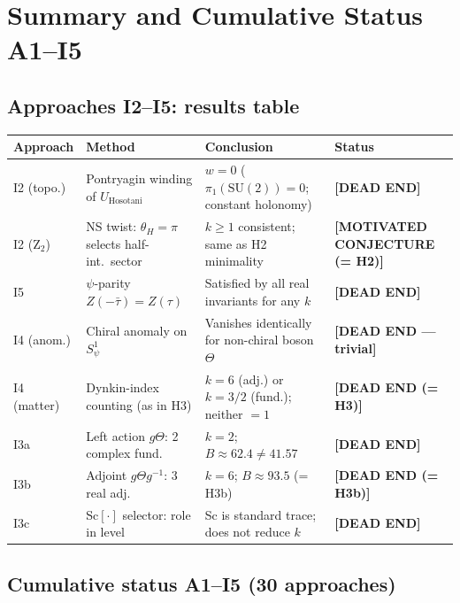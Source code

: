 \documentclass[11pt,a4paper]{article}
\theoremstyle{definition}
\theoremstyle{remark}
\begin{document}
\section{Summary and Cumulative Status A1--I5}
\label{sec:summary}

\subsection{Approaches I2--I5: results table}

\begin{center}
\begin{tabular}{p{1.4cm}p{4.2cm}p{4.5cm}p{3.2cm}}
  \toprule
  Approach & Method & Conclusion & Status \\
  \midrule
  I2 (topo.) & Pontryagin winding of $U_{\mathrm{Hosotani}}$ &
    $w = 0$ ($\pi_1(\mathrm{SU}(2)) = 0$; constant holonomy) &
    \textbf{[DEAD END]} \\[4pt]
  I2 (Z$_2$) & NS twist: $\theta_H = \pi$ selects half-int.\ sector &
    $k \geq 1$ consistent; same as H2 minimality &
    \textbf{[MOTIVATED CONJECTURE (= H2)]} \\[4pt]
  I5 & $\psi$-parity $Z(-\bar\tau) = Z(\tau)$ &
    Satisfied by all real invariants for any $k$ &
    \textbf{[DEAD END]} \\[4pt]
  I4 (anom.) & Chiral anomaly on $S^1_\psi$ &
    Vanishes identically for non-chiral boson $\Theta$ &
    \textbf{[DEAD END — trivial]} \\[4pt]
  I4 (matter) & Dynkin-index counting (as in H3) &
    $k = 6$ (adj.) or $k = 3/2$ (fund.); neither $= 1$ &
    \textbf{[DEAD END (= H3)]} \\[4pt]
  I3a & Left action $g\Theta$: 2 complex fund.\ &
    $k = 2$; $B \approx 62.4 \neq 41.57$ &
    \textbf{[DEAD END]} \\[4pt]
  I3b & Adjoint $g\Theta g^{-1}$: 3 real adj.\ &
    $k = 6$; $B \approx 93.5$ (= H3b) &
    \textbf{[DEAD END (= H3b)]} \\[4pt]
  I3c & Sc$[\cdot]$ selector: role in level &
    Sc is standard trace; does not reduce $k$ &
    \textbf{[DEAD END]} \\
  \bottomrule
\end{tabular}
\end{center}

\subsection{Cumulative status A1--I5 (30 approaches)}
\end{document}
